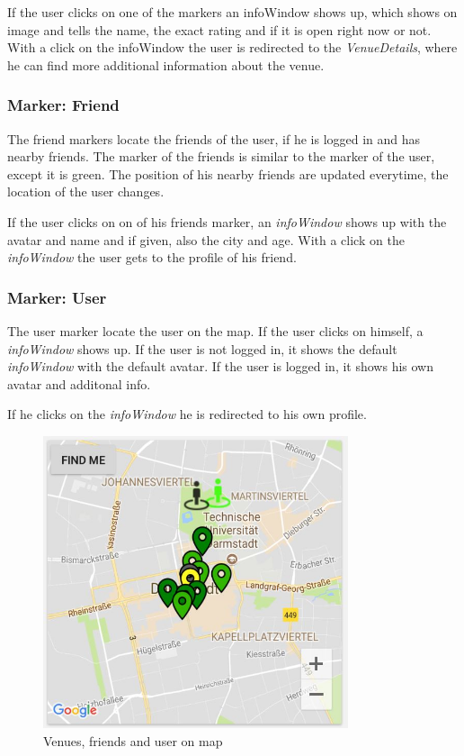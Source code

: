 If the user clicks on one of the markers an infoWindow shows up, which shows on image and tells the name, the exact rating and if it is open right now or not. With a click on the infoWindow the user is redirected to the \textit{VenueDetails}, where he can find more additional information about the venue.

\subsubsection{Marker: Friend}
The friend markers locate the friends of the user, if he is logged in and has nearby friends. The marker of the friends is similar to the marker of the user, except it is green.
The position of his nearby friends are updated everytime, the location of the user changes. 

If the user clicks on on of his friends marker, an \textit{infoWindow} shows up with the avatar and name and if given, also the city and age. With a click on the \textit{infoWindow} the user gets to the profile of his friend.

\subsubsection{Marker: User}
The user marker locate the user on the map. If the user clicks on himself, a \textit{infoWindow} shows up. If the user is not logged in, it shows the default \textit{infoWindow} with the default avatar. If the user is logged in, it shows his own avatar and additonal info. 

If he clicks on the \textit{infoWindow} he is redirected to his own profile.

\begin{figure}[htbp]
 	\includegraphics[width=0.8\textwidth]{images/venuesonmap.jpg}
 	\centering
 	\caption[]{Venues, friends and user on map}
 	\label{fig:venuesonmap}
\end{figure}

